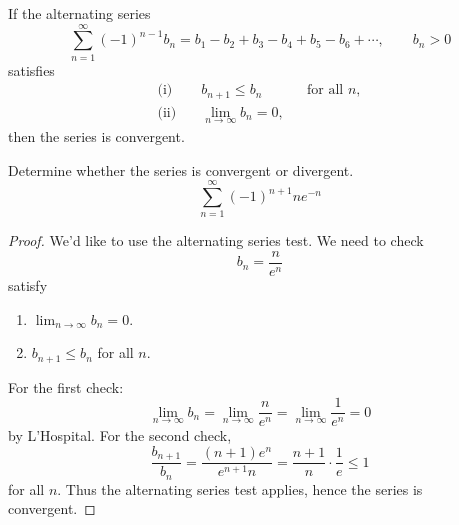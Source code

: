 \documentclass[openany]{book}
\begin{document}
\begin{prop}
    If the alternating series
\[
\sum_{n=1}^{\infty}(-1)^{n-1}b_n
= b_1-b_2+b_3-b_4+b_5-b_6+\cdots,
\qquad b_n>0
\]
satisfies
\[
\begin{aligned}
\text{(i)}\quad & b_{n+1}\leq b_n
&& \text{for all } n,\\[6pt]
\text{(ii)}\quad & \lim_{n\to\infty}b_n=0,
\end{aligned}
\]
then the series is convergent.
\end{prop}


    


\begin{prob}
    Determine whether the series is convergent or divergent.
    \[
    \sum_{n=1}^{\infty} (-1)^{n+1} n e^{-n}
    \]
\end{prob}
\begin{proof}
    We'd like to use the alternating series test. We need to check 
    \begin{equation*}
        b_n=\frac{n}{e^n}
    \end{equation*}
    satisfy 
    \begin{enumerate}
        \item $\lim_{n\to\infty}b_n=0$.
        \item $b_{n+1}\leq b_n$ for all $n$.
    \end{enumerate}
    For the first check:
    \begin{equation*}
        \lim_{n\to\infty}b_n=\lim_{n\to\infty}\frac{n}{e^n}=\lim_{n\to\infty}\frac{1}{e^n}=0
    \end{equation*}
    by L'Hospital. For the second check, 
    \begin{equation*}
        \frac{b_{n+1}}{b_n}=\frac{(n+1)e^n}{e^{n+1}n}=\frac{n+1}{n}\cdot\frac{1}{e}\leq 1
    \end{equation*}
    for all $n$. Thus the alternating series test applies, hence the series is convergent.
\end{proof}


\newpage
\end{document}
